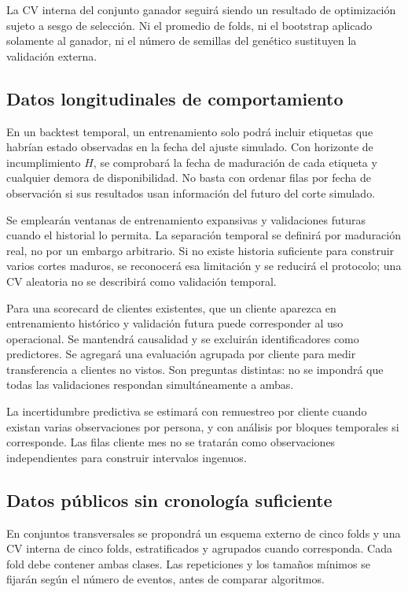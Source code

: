 \documentclass[11pt,letterpaper]{article}
\begin{document}
La CV interna del conjunto ganador seguirá siendo un resultado de optimización sujeto a sesgo de selección. Ni el promedio de folds, ni el bootstrap aplicado solamente al ganador, ni el número de semillas del genético sustituyen la validación externa.

\subsection{Datos longitudinales de comportamiento}\label{sec:8.2}

En un backtest temporal, un entrenamiento solo podrá incluir etiquetas que habrían estado observadas en la fecha del ajuste simulado. Con horizonte de incumplimiento \(H\), se comprobará la fecha de maduración de cada etiqueta y cualquier demora de disponibilidad. No basta con ordenar filas por fecha de observación si sus resultados usan información del futuro del corte simulado.

Se emplearán ventanas de entrenamiento expansivas y validaciones futuras cuando el historial lo permita. La separación temporal se definirá por maduración real, no por un embargo arbitrario. Si no existe historia suficiente para construir varios cortes maduros, se reconocerá esa limitación y se reducirá el protocolo; una CV aleatoria no se describirá como validación temporal.

Para una scorecard de clientes existentes, que un cliente aparezca en entrenamiento histórico y validación futura puede corresponder al uso operacional. Se mantendrá causalidad y se excluirán identificadores como predictores. Se agregará una evaluación agrupada por cliente para medir transferencia a clientes no vistos. Son preguntas distintas: no se impondrá que todas las validaciones respondan simultáneamente a ambas.

La incertidumbre predictiva se estimará con remuestreo por cliente cuando existan varias observaciones por persona, y con análisis por bloques temporales si corresponde. Las filas cliente mes no se tratarán como observaciones independientes para construir intervalos ingenuos.

\subsection{Datos públicos sin cronología suficiente}\label{sec:8.3}

En conjuntos transversales se propondrá un esquema externo de cinco folds y una CV interna de cinco folds, estratificados y agrupados cuando corresponda. Cada fold debe contener ambas clases. Las repeticiones y los tamaños mínimos se fijarán según el número de eventos, antes de comparar algoritmos.
\end{document}
